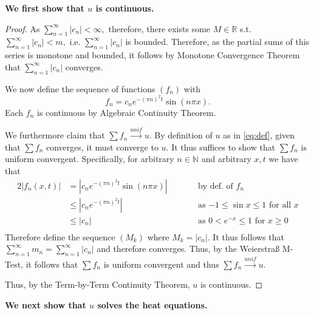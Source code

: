 \documentclass[10pt]{article}
\begin{document}
\noindent
\textbf{We first show that $u$ is continuous.}
\begin{proof}
    As  $\sum_{n=1}^{\infty}|c_n|<\infty,$ therefore, there exists some $M\in\mathbb{R}$ s.t.  $\sum_{n=1}^{\infty}|c_n|<m,$ i.e. $\sum_{n=1}^{\infty}|c_n|$ is bounded. Therefore, as the partial sums of this series is monotone and bounded, it follows by Monotone Convergence Theorem that $\sum_{n=1}^{\infty}|c_n|$ converges.

    We now define the sequence of functions $(f_n)$ with
    \[f_n = c_ne^{-(\pi n)^2t}\sin(n\pi x).\]
    Each $f_n$ is continuous by Algebraic Continuity Theorem. 
    
    We furthermore claim that $\sum f_n \stackrel{unif}{\to} u.$ By definition of $u$ as in \eqref{eq:def}, given that $\sum f_n$ converges, it must converge to $u$. It thus suffices to show that $\sum f_n$ is uniform convergent. Specifically, for arbitrary $n\in\mathbb{N}$ and arbitrary $x,t$ we have that
    \begin{alignat*}{2}
        |f_n(x,t)| &= \left |c_ne^{-(\pi n)^2t}\sin(n\pi x)\right | \qquad&&\text{by def. of $f_n$}\\
        &\le |c_ne^{-(\pi n)^2t}| \qquad&&\text{as $-1\le \sin x \le 1$ for all $x$}\\
        &\le  |c_n| &&\text{as $0<e^{-x}\le 1$ for $x\ge0$}\\
    \end{alignat*}
    Therefore define the sequence $(M_k)$ where $M_k = |c_n|.$ It thus follows that $\sum_{n=1}^{\infty} m_n = \sum_{n=1}^{\infty} |c_n|$ and therefore converges. Thus, by the Weierstraß M-Test, it follows that $\sum f_n$ is uniform convergent and thus $\sum f_n \stackrel{unif}{\to} u.$

    Thus, by the Term-by-Term Continuity Theorem, $u$ is continuous.
\end{proof}

\noindent
\textbf{We next show that $u$ solves the heat equations.}
\end{document}
